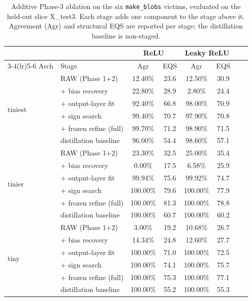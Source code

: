 \documentclass[runningheads,orivec]{llncs}
\begin{document}
\begin{table}[H]
\centering
\caption{Additive Phase-3 ablation on the six \texttt{make\_blobs} victims, evaluated
on the held-out slice X\_test3. Each stage adds one component to the stage above it.
Agreement (Agr) and structural EQS are reported per stage; the distillation baseline
is non-staged.}
\label{tab:ablation}
\setlength{\tabcolsep}{4pt}\small
\begin{tabular}{llcccccc}
\toprule
& & \multicolumn{2}{c}{ReLU} & \multicolumn{2}{c}{Leaky ReLU} \\
\cmidrule(lr){3-4}\cmidrule(lr){5-6}
Arch & Stage & Agr & EQS & Agr & EQS \\
\midrule
\multirow{6}{*}{tiniest}
 & RAW (Phase 1+2)        & 12.40\% & 23.6 & 12.50\% & 30.9 \\
 & + bias recovery        & 22.80\% & 28.9 & 2.80\%  & 24.4 \\
 & + output-layer fit     & 92.40\% & 66.8 & 98.00\% & 70.9 \\
 & + sign search          & 99.40\% & 70.7 & 97.90\% & 70.8 \\
 & + frozen refine (full) & 99.70\% & 71.2 & 98.90\% & 71.5 \\
 & distillation baseline  & 96.00\% & 54.4 & 98.60\% & 57.1 \\
\midrule
\multirow{6}{*}{tinier}
 & RAW (Phase 1+2)        & 23.30\% & 32.5 & 25.00\% & 35.4 \\
 & + bias recovery        & 0.00\%  & 17.5 & 6.58\%  & 25.9 \\
 & + output-layer fit     & 99.94\% & 75.6 & 99.92\% & 74.7 \\
 & + sign search          & 100.00\% & 79.6 & 100.00\% & 77.9 \\
 & + frozen refine (full) & 100.00\% & 81.3 & 100.00\% & 78.8 \\
 & distillation baseline  & 100.00\% & 60.7 & 100.00\% & 60.2 \\
\midrule
\multirow{6}{*}{tiny}
 & RAW (Phase 1+2)        & 3.00\%   & 19.2 & 10.68\% & 26.7 \\
 & + bias recovery        & 14.34\%  & 24.8 & 12.60\% & 27.7 \\
 & + output-layer fit     & 100.00\% & 71.0 & 100.00\% & 72.5 \\
 & + sign search          & 100.00\% & 74.1 & 100.00\% & 75.7 \\
 & + frozen refine (full) & 100.00\% & 75.3 & 100.00\% & 77.1 \\
 & distillation baseline  & 100.00\% & 55.2 & 100.00\% & 55.3 \\
\bottomrule
\end{tabular}
\end{table}
\end{document}
